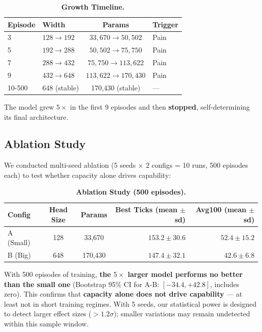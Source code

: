 \documentclass{article}
\begin{document}
\begin{table}[h]
\centering
\caption{\textbf{Growth Timeline.}}
\label{tab:growth_timeline}
\begin{tabular}{llcl}
\toprule
\textbf{Episode} & \textbf{Width} & \textbf{Params} & \textbf{Trigger} \\
\midrule
3 & $128 \rightarrow 192$ & $33,670 \rightarrow 50,502$ & Pain \\
5 & $192 \rightarrow 288$ & $50,502 \rightarrow 75,750$ & Pain \\
7 & $288 \rightarrow 432$ & $75,750 \rightarrow 113,622$ & Pain \\
9 & $432 \rightarrow 648$ & $113,622 \rightarrow 170,430$ & Pain \\
10-500 & 648 (stable) & 170,430 (stable) & --- \\
\bottomrule
\end{tabular}
\end{table}

The model grew $5\times$ in the first 9 episodes and then \textbf{stopped}, self-determining its final architecture.

\subsection{Ablation Study}
\label{sec:ablation_500}
We conducted multi-seed ablation (5 seeds $\times$ 2 configs = 10 runs, 500 episodes each) to test whether capacity alone drives capability:

\begin{table}[h]
\centering
\caption{\textbf{Ablation Study (500 episodes).}}
\label{tab:ablation_500}
\begin{tabular}{lccrr}
\toprule
\textbf{Config} & \textbf{Head Size} & \textbf{Params} & \textbf{Best Ticks (mean $\pm$ sd)} & \textbf{Avg100 (mean $\pm$ sd)} \\
\midrule
A (Small) & 128 & 33,670 & $153.2 \pm 30.6$ & $52.4 \pm 15.2$ \\
B (Big) & 648 & 170,430 & $147.4 \pm 32.1$ & $42.6 \pm 6.8$ \\
\bottomrule
\end{tabular}
\end{table}

With 500 episodes of training, \textbf{the $5\times$ larger model performs no better than the small one} (Bootstrap 95\% CI for A-B: $[-34.4, +42.8]$, includes zero). This confirms that \textbf{capacity alone does not drive capability} --- at least not in short training regimes. With 5 seeds, our statistical power is designed to detect larger effect sizes ($>1.2\sigma$); smaller variations may remain undetected within this sample window.
\end{document}
